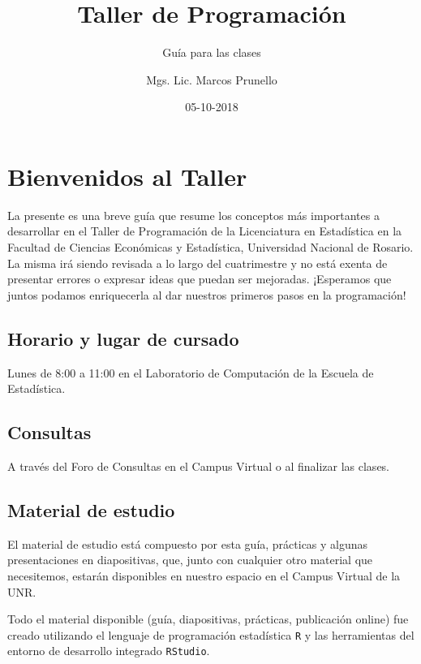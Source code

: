 \documentclass[]{book}
\title{Taller de Programación}
\subtitle{Guía para las clases}
\author{Mgs. Lic. Marcos Prunello}
\date{05-10-2018}
\begin{document}
\maketitle

{
\setcounter{tocdepth}{1}
\tableofcontents
}
\chapter{Bienvenidos al Taller}\label{bienvenidos-al-taller}

La presente es una breve guía que resume los conceptos más importantes a
desarrollar en el Taller de Programación de la Licenciatura en
Estadística en la Facultad de Ciencias Económicas y Estadística,
Universidad Nacional de Rosario. La misma irá siendo revisada a lo largo
del cuatrimestre y no está exenta de presentar errores o expresar ideas
que puedan ser mejoradas. ¡Esperamos que juntos podamos enriquecerla al
dar nuestros primeros pasos en la programación!

\section*{Horario y lugar de cursado}\label{horario-y-lugar-de-cursado}

Lunes de 8:00 a 11:00 en el Laboratorio de Computación de la Escuela de
Estadística.

\section*{Consultas}\label{consultas}

A través del Foro de Consultas en el Campus Virtual o al finalizar las
clases.

\section*{Material de estudio}\label{material-de-estudio}

El material de estudio está compuesto por esta guía, prácticas y algunas
presentaciones en diapositivas, que, junto con cualquier otro material
que necesitemos, estarán disponibles en nuestro espacio en el Campus
Virtual de la UNR.

Todo el material disponible (guía, diapositivas, prácticas, publicación
online) fue creado utilizando el lenguaje de programación estadística
\texttt{R} y las herramientas del entorno de desarrollo integrado
\texttt{RStudio}.
\end{document}
